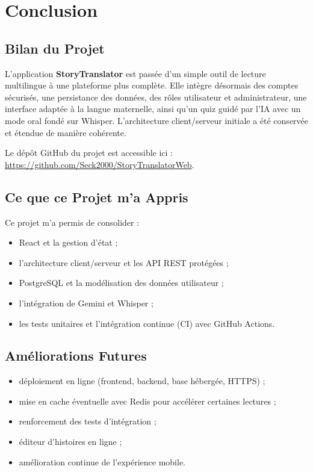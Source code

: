 \documentclass[12pt,twoside,letterpaper]{article}
\begin{document}
\newpage

\section{Conclusion}

\subsection{Bilan du Projet}

L'application \textbf{StoryTranslator} est pass\'ee d'un simple outil de lecture multilingue
\`a une plateforme plus compl\`ete.
Elle int\`egre d\'esormais des comptes s\'ecuris\'es, une persistance des donn\'ees,
des r\^oles utilisateur et administrateur, une interface adapt\'ee \`a la langue maternelle,
ainsi qu'un quiz guid\'e par l'IA avec un mode oral fond\'e sur Whisper.
L'architecture client/serveur initiale a \'et\'e conserv\'ee et \'etendue de mani\`ere coh\'erente.

Le d\'ep\^ot GitHub du projet est accessible ici :
\url{https://github.com/Seck2000/StoryTranslatorWeb}.

\subsection{Ce que ce Projet m'a Appris}

Ce projet m'a permis de consolider :
\begin{itemize}[leftmargin=*]
  \item React et la gestion d'\'etat ;
  \item l'architecture client/serveur et les API REST prot\'eg\'ees ;
  \item PostgreSQL et la mod\'elisation des donn\'ees utilisateur ;
  \item l'int\'egration de Gemini et Whisper ;
  \item les tests unitaires et l'int\'egration continue (CI) avec GitHub Actions.
\end{itemize}

\subsection{Am\'eliorations Futures}

\begin{itemize}[leftmargin=*]
  \item d\'eploiement en ligne (frontend, backend, base h\'eberg\'ee, HTTPS) ;
  \item mise en cache \'eventuelle avec Redis pour acc\'el\'erer certaines lectures ;
  \item renforcement des tests d'int\'egration ;
  \item \'editeur d'histoires en ligne ;
  \item am\'elioration continue de l'exp\'erience mobile.
\end{itemize}
\end{document}
